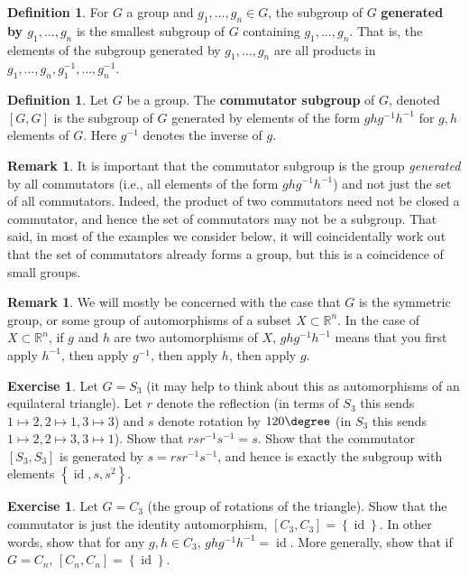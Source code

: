 \documentclass[reqno, 12pt, letter]{article}
\theoremstyle{plain}
\theoremstyle{definition}
\newtheorem{definition}[theorem]{Definition}
\newtheorem{remark}[theorem]{Remark}
\newtheorem{exercise}[theorem]{Exercise}
\theoremstyle{remark}
\numberwithin{equation}{section}
\newcommand\br{{\mathbb R}}
\DeclareMathOperator\id{id}
\begin{document}
\begin{definition}
	\label{definition:}
	For $G$ a group and $g_1, \ldots, g_n \in G$, the subgroup of
	$G$ {\bf generated by $g_1, \ldots, g_n$}
	is the smallest subgroup of $G$ containing $g_1, \ldots, g_n$.
	That is, the elements of the subgroup
	generated by $g_1, \ldots, g_n$ are
	all products in $g_1, \ldots, g_n, g_1^{-1}, \ldots, g_n^{-1}$.
\end{definition}

\begin{definition}
	\label{definition:}
	Let $G$ be a group. The {\bf commutator subgroup} of $G$, denoted $\left[ G,G \right]$ is the subgroup of $G$ generated 
	by elements of the form $ghg^{-1}h^{-1}$ for $g, h$ elements of $G$.
	Here $g^{-1}$ denotes the inverse of $g$.
\end{definition}
\begin{remark}
	\label{remark:}
	It is important that the commutator subgroup is the group {\em generated}
	by all commutators (i.e., all elements of the form $ghg^{-1}h^{-1}$)
	and not just the set of all commutators.
	Indeed, the product of two commutators need not be closed a commutator,
	and hence the set of commutators may not be a subgroup.
	That said, in most of the examples we consider below,
	it will coincidentally work out that the set of commutators already forms
	a group, but this is a coincidence of small groups.
\end{remark}

\begin{remark}
	\label{remark:}
	We will mostly be concerned with the case that $G$ is the symmetric group, or some group of automorphisms of a subset $X \subset \br^n$.
	In the case of $X \subset \br^n$, if $g$ and $h$ are two automorphisms of $X$, $ghg^{-1}h^{-1}$ means that you first apply $h^{-1}$, then apply $g^{-1}$, then
	apply $h$, then apply $g$.
\end{remark}
\begin{exercise}
	\label{exercise:}
	Let $G = S_3$ (it may help to think about this as automorphisms of an equilateral triangle).
	Let $r$ denote the reflection (in terms of $S_3$ this sends $1 \mapsto 2, 2 \mapsto 1, 3\mapsto 3$)
	and $s$ denote rotation by $120 \degree$ (in $S_3$ this sends $1 \mapsto 2, 2 \mapsto 3, 3 \mapsto 1$).
	Show that $rsr^{-1}s^{-1} = s$.
	Show that the commutator $\left[ S_3, S_3 \right]$ is generated by $s = rsr^{-1}s^{-1}$, and hence is exactly the subgroup
	with elements $\left\{ \id, s, s^2 \right\}$.
\end{exercise}
\begin{exercise}
	\label{exercise:}
	Let $G = C_3$ (the group of rotations of the triangle). Show that the commutator is just the identity automorphism, $\left[ C_3, C_3 \right] = \left\{ \id \right\}$.
	In other words, show that for any $g, h \in C_3$, $ghg^{-1}h^{-1} = \id$.
	More generally, show that if $G = C_n$, $\left[ C_n, C_n \right] = \left\{ \id \right\}$.
\end{exercise}
\end{document}
